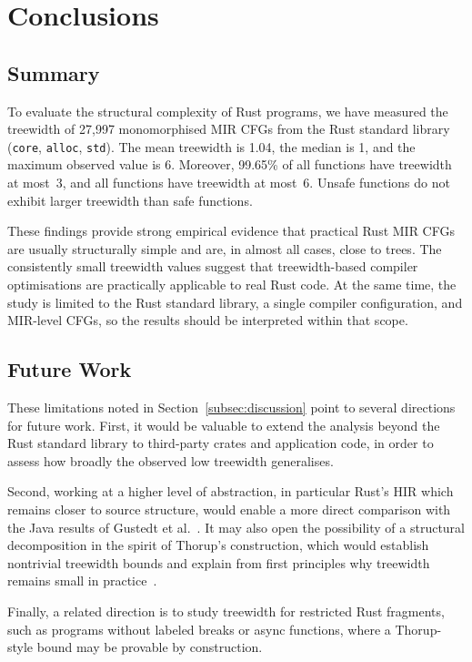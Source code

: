 \section{Conclusions}
\label{sec:conclusion}

\subsection{Summary}
\label{subsec:conclusion-summary}

To evaluate the structural complexity of Rust programs, we have measured the treewidth of 27{,}997 monomorphised MIR CFGs from the Rust standard library (\texttt{core}, \texttt{alloc}, \texttt{std}).
The mean treewidth is 1.04, the median is 1, and the maximum observed value is 6.
Moreover, 99.65\% of all functions have treewidth at most~3, and all functions have treewidth at most~6.
Unsafe functions do not exhibit larger treewidth than safe functions.

These findings provide strong empirical evidence that practical Rust MIR CFGs are usually structurally simple and are, in almost all cases, close to trees.
The consistently small treewidth values suggest that treewidth-based compiler optimisations are practically applicable to real Rust code.
At the same time, the study is limited to the Rust standard library, a single compiler configuration, and MIR-level CFGs, so the results should be interpreted within that scope.

\subsection{Future Work}
\label{subsec:future-work}

These limitations noted in Section~\ref{subsec:discussion} point to several directions for future work.
First, it would be valuable to extend the analysis beyond the Rust standard library to third-party crates and application code, in order to assess how broadly the observed low treewidth generalises.

Second, working at a higher level of abstraction, in particular Rust's HIR which remains closer to source structure, would enable a more direct comparison with the Java results of Gustedt et al.~\cite{gustedt_2002}.
It may also open the possibility of a structural decomposition in the spirit of Thorup's construction, which would establish nontrivial treewidth bounds and explain from first principles why treewidth remains small in practice~\cite{thorup_1998}.

Finally, a related direction is to study treewidth for restricted Rust fragments, such as programs without labeled breaks or async functions, where a Thorup-style bound may be provable by construction.
